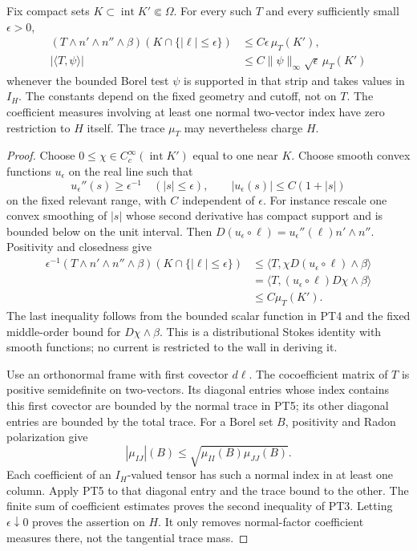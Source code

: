 \begin{lemma}
\label{lem:r13-normal-strip-bounds}
Fix compact sets $K\subset\operatorname{int}K'\Subset\Omega$.
For every such $T$ and every sufficiently small $\epsilon>0$,
\[
 \begin{split}
 (T\wedge n'\wedge n''\wedge\beta)
       (K\cap\{ |\ell|\le\epsilon\})
             &\le C\epsilon\,\mu_T(K'),\\
 |\langle T,\psi\rangle|
             &\le C\|\psi\|_\infty\sqrt\epsilon\,
                              \mu_T(K')
 \end{split}
 \tag{PT3}
\]
whenever the bounded Borel test $\psi$ is supported in that
strip and takes values in $I_H$.  The constants depend on
the fixed geometry and cutoff, not on $T$.  The coefficient
measures involving at least one normal two-vector index have
zero restriction to $H$ itself.  The trace $\mu_T$ may
nevertheless charge $H$.
\end{lemma}

\begin{proof}
Choose $0\le\chi\in C_c^\infty(\operatorname{int}K')$
equal to one near $K$.  Choose smooth convex functions
$u_\epsilon$ on the real line such that
\[
 u_\epsilon''(s)\ge\epsilon^{-1}
          \quad (|s|\le\epsilon),\qquad
 |u_\epsilon(s)|\le C(1+|s|)
 \tag{PT4}
\]
on the fixed relevant range, with $C$ independent of
$\epsilon$.  For instance rescale one convex smoothing
of $|s|$ whose second derivative has compact support and
is bounded below on the unit interval.  Then
$D(u_\epsilon\circ\ell)=u_\epsilon''(\ell)n'\wedge n''$.
Positivity and closedness give
\[
 \begin{split}
 \epsilon^{-1}
   (T\wedge n'\wedge n''\wedge\beta)
          (K\cap\{|\ell|\le\epsilon\})
 &\le\langle T,\chi D(u_\epsilon\circ\ell)\wedge\beta\rangle\\
 &=\langle T,(u_\epsilon\circ\ell)D\chi\wedge\beta\rangle\\
 &\le C\mu_T(K').
 \end{split}
 \tag{PT5}
\]
The last inequality follows from the bounded scalar function
in PT4 and the fixed middle-order bound for $D\chi\wedge\beta$.
This is a distributional Stokes identity with smooth functions;
no current is restricted to the wall in deriving it.

Use an orthonormal frame with first covector $d\ell$.
The cocoefficient matrix of $T$ is positive semidefinite on
two-vectors.  Its diagonal entries whose index contains this
first covector are bounded by the normal trace in PT5; its
other diagonal entries are bounded by the total trace.
For a Borel set $B$, positivity and Radon polarization give
\[
           |\mu_{IJ}|(B)
                   \le\sqrt{\mu_{II}(B)\mu_{JJ}(B)}.
 \tag{PT6}
\]
Each coefficient of an $I_H$-valued tensor has such a normal
index in at least one column.  Apply PT5 to that diagonal
entry and the trace bound to the other.  The finite sum of
coefficient estimates proves the second inequality of PT3.
Letting $\epsilon\downarrow0$ proves the assertion on $H$.
It only removes normal-factor coefficient measures there,
not the tangential trace mass.
\end{proof}

